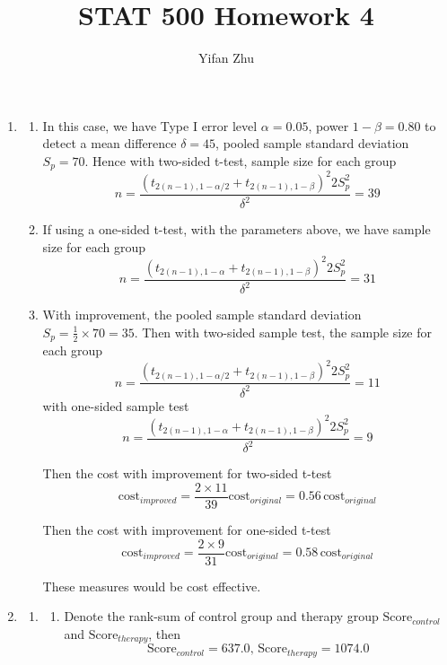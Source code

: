 \documentclass{article}
\begin{document}
	

	
	\title{STAT 500 Homework 4}
	\author{Yifan Zhu}
	\maketitle
	
	\begin{enumerate}[leftmargin = 0 em, label = \arabic*., font = \bfseries]
	\item
	\begin{enumerate}
	\item
	In this case, we have Type I error level $\alpha = 0.05$, power $1 - \beta = 0.80$ to detect a mean difference $\delta = 45$, pooled sample standard deviation $S_p = 70$. Hence with two-sided t-test, sample size for each group
	\[ n = \frac{(t_{2(n-1), 1 - \alpha/2}+ t_{2(n-1), 1- \beta})^2 2S_p^2 }{\delta^2} = 39\]

	\item
	If using a one-sided t-test, with the parameters above, we have sample size for each group
	\[ n = \frac{(t_{2(n-1), 1 - \alpha}+ t_{2(n-1), 1- \beta})^2 2S_p^2 }{\delta^2} = 31\]

	\item
	With improvement, the pooled sample standard deviation $S_p = \frac{1}{2} \times 70 = 35$. Then with two-sided sample test, the sample size for each group
	\[ n = \frac{(t_{2(n-1), 1 - \alpha/2}+ t_{2(n-1), 1- \beta})^2 2S_p^2 }{\delta^2} = 11\]
	with one-sided sample test
	\[ n = \frac{(t_{2(n-1), 1 - \alpha}+ t_{2(n-1), 1- \beta})^2 2S_p^2 }{\delta^2} = 9\]

	Then the cost with improvement for two-sided t-test
	\[\mathrm{cost}_{improved} = \frac{2\times 11}{39}\mathrm{cost}_{original} = 0.56\, \mathrm{cost}_{original}\]

	Then the cost with improvement for one-sided t-test
	\[\mathrm{cost}_{improved} = \frac{2\times 9}{31}\mathrm{cost}_{original} = 0.58 \,\mathrm{cost}_{original}\]

	These measures would be cost effective.




	
\end{enumerate}

\newpage
\item
\begin{enumerate}
	\item 
	\begin{enumerate}[label = (\roman*)]
	\item
	Denote the rank-sum of control group and therapy group $\mathrm{Score}_{control}$ and $\mathrm{Score}_{therapy}$, then
	\[\mathrm{Score}_{control} = 637.0,\, \mathrm{Score}_{therapy} = 1074.0\]


\end{enumerate}
\end{enumerate}
\end{enumerate}
\end{document}
